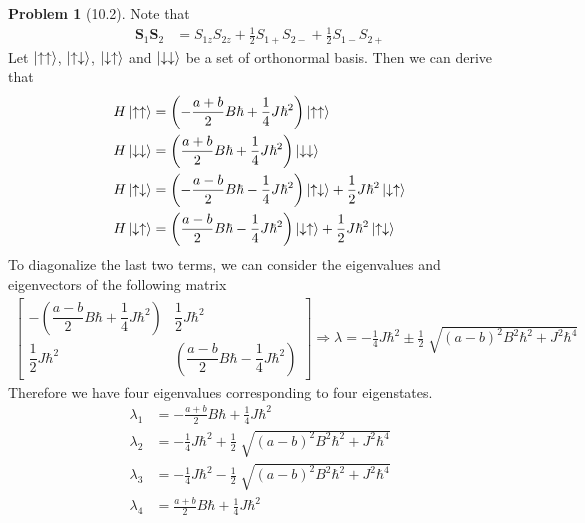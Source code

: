 \documentclass[twoside,11pt]{article}
\theoremstyle{definition}
\newtheorem{problem}{Problem}
\theoremstyle{remark}
\begin{document}
\begin{problem}[10.2]
Note that
\begin{align*}
    \mathbf{S}_1\mathbf{S}_2 &= S_{1z} S_{2z} + \frac{1}{2}S_{1+}S_{2-}
    + \frac{1}{2}S_{1-}S_{2+}
\end{align*}
Let $\ket{\uparrow\uparrow}$, $\ket{\uparrow\downarrow}$,
$\ket{\downarrow\uparrow}$ and $\ket{\downarrow\downarrow}$ 
be a set of orthonormal basis.
Then we can derive that
\begin{align*}
    H\ket{\uparrow\uparrow} &= \left(
        -\frac{a+b}{2}B\hbar + \frac{1}{4}J\hbar^2
    \right)\ket{\uparrow\uparrow}\\
    H\ket{\downarrow\downarrow} &= 
    \left(
        \frac{a+b}{2}B\hbar+\frac{1}{4}J\hbar^2
    \right)\ket{\downarrow\downarrow}\\
    H\ket{\uparrow\downarrow} &=
    \left(
        -\frac{a-b}{2}B\hbar-\frac{1}{4}J\hbar^2
    \right)\ket{\uparrow\downarrow}
    + \frac{1}{2}J\hbar^2\ket{\downarrow\uparrow}\\
    H\ket{\downarrow\uparrow} &=
    \left(
        \frac{a-b}{2}B\hbar-\frac{1}{4}J\hbar^2
    \right)\ket{\downarrow\uparrow}
    + \frac{1}{2}J\hbar^2\ket{\uparrow\downarrow}
\end{align*}
To diagonalize the last two terms, we can consider the eigenvalues and
eigenvectors of the following matrix
\begin{align*}
    \begin{bmatrix}
        -\left(\dfrac{a-b}{2}B\hbar+\dfrac{1}{4}J\hbar^2\right) & 
        \dfrac{1}{2}J\hbar^2\\[1em]
        \dfrac{1}{2}J\hbar^2 & 
        \left(\dfrac{a-b}{2}B\hbar-\dfrac{1}{4}J\hbar^2\right)
    \end{bmatrix}
    \Rightarrow
    \lambda=-\frac{1}{4}J\hbar^2\pm\frac{1}{2}\sqrt[]{(a-b)^2B^2\hbar^2+J^2\hbar^4}
\end{align*}
Therefore we have four eigenvalues corresponding to four eigenstates.
\begin{align*}
    \lambda_1 &= -\frac{a+b}{2}B\hbar + \frac{1}{4}J\hbar^2\\
    \lambda_2 &= -\frac{1}{4}J\hbar^2 + \frac{1}{2}\sqrt[]{(a-b)^2B^2\hbar^2+J^2\hbar^4}\\
    \lambda_3 &= -\frac{1}{4}J\hbar^2 - \frac{1}{2}\sqrt[]{(a-b)^2B^2\hbar^2+J^2\hbar^4}\\
    \lambda_4 &= \frac{a+b}{2}B\hbar + \frac{1}{4}J\hbar^2
\end{align*}

\end{problem}
\end{document}
